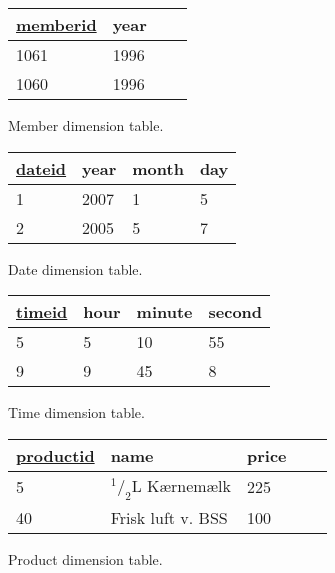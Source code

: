 \begin{figure}[H]
    \centering
    \begin{tabular}{|l|l|l|l|}
        \hline
        \underline{memberid}    & year  \\ \hline
        1061                    & 1996  \\ \hline
        1060                    & 1996  \\ \hline
    \end{tabular}
    \caption{Member dimension table.}
    \label{fig:member_scheme}

\vspace{0.5cm}

    \begin{tabular}{|l|l|l|l|}
        \hline
        \underline{dateid}      & year      & month & day   \\ \hline
        1                       & 2007      & 1     & 5     \\ \hline
        2                       & 2005      & 5     & 7     \\ \hline
    \end{tabular}
    \caption{Date dimension table.}
    \label{fig:day_scheme}

\vspace{0.5cm}

    \begin{tabular}{|l|l|l|l|}
        \hline
        \underline{timeid}      & hour      & minute    & second    \\ \hline
        5                       & 5         & 10        & 55        \\ \hline
        9                       & 9         & 45        & 8         \\ \hline
    \end{tabular}
    \caption{Time dimension table.}
    \label{fig:time_scheme}

\vspace{0.5cm}

    \begin{tabular}{|l|l|l|l|l|}
        \hline
        \underline{productid}   & name                  & price     \\ \hline
        5                       & $^1/_2$L Kærnemælk    & 225       \\ \hline
        40                      & Frisk luft v. BSS     & 100       \\ \hline
    \end{tabular}
    \caption{Product dimension table.}
    \label{fig:product_scheme}


\end{figure}
